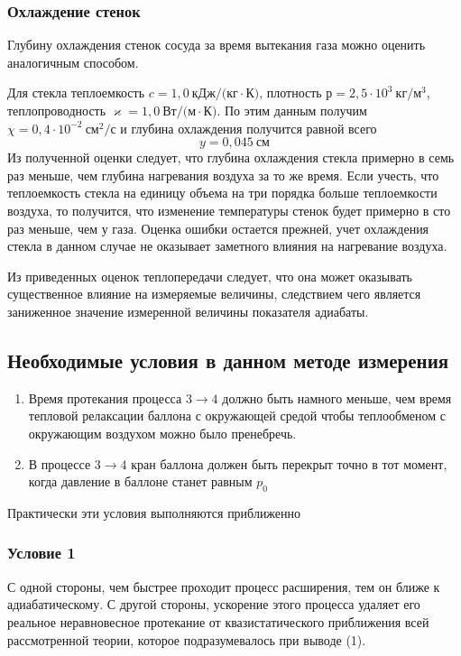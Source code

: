 \documentclass[a4paper,12pt]{article}
\theoremstyle{plain} %
\theoremstyle{definition} %
\theoremstyle{remark} %
\begin{document}
\subsubsection{Охлаждение стенок}

Глубину охлаждения стенок сосуда за время вытекания газа можно оценить аналогичным способом.

Для стекла теплоемкость $c = 1,0\ \text{кДж}/\text{(кг}\cdot \text{К)}$, плотность $р = 2,5\cdot10^3\ \text{кг}/\text{м}^3$, теплопроводность $\varkappa = 1,0\ \text{Вт}/\text{(м}\cdot \text{К)}$. По этим данным получим $\chi = 0,4 \cdot 10^{-2}\ \text{см}^2/\text{с}$ и глубина охлаждения получится равной всего 
\[ y = 0,045\ \text{см}\]
Из полученной оценки следует, что глубина охлаждения стекла примерно в семь раз меньше, чем глубина нагревания воздуха за то же время. Если учесть, что теплоемкость стекла на единицу объема на три порядка больше теплоемкости воздуха, то получится, что изменение температуры стенок будет примерно в сто раз меньше, чем у газа. Оценка ошибки остается прежней, учет охлаждения стекла в данном случае не оказывает заметного влияния на нагревание воздуха.

Из приведенных оценок теплопередачи следует, что она может оказывать существенное влияние на измеряемые величины, следствием чего является заниженное значение измеренной величины показателя адиабаты. 
\subsection{Необходимые условия в данном методе измерения}
\begin{enumerate}
	\item Время протекания процесса $3\rightarrow4$ должно быть намного меньше, чем время тепловой релаксации баллона с окружающей средой чтобы теплообменом с окружающим воздухом можно было пренебречь.
	\item В процессе $3\rightarrow4$ кран баллона должен быть перекрыт точно в тот момент, когда давление в баллоне станет равным $p_0$
\end{enumerate}
Практически эти условия выполняются приближенно
\subsubsection{Условие 1}
С одной стороны, чем быстрее проходит процесс расширения, тем он ближе к адиабатическому. С другой стороны, ускорение этого процесса удаляет его реальное неравновесное протекание от квазистатического приближения всей рассмотренной теории, которое подразумевалось при выводе (1).
\end{document}
